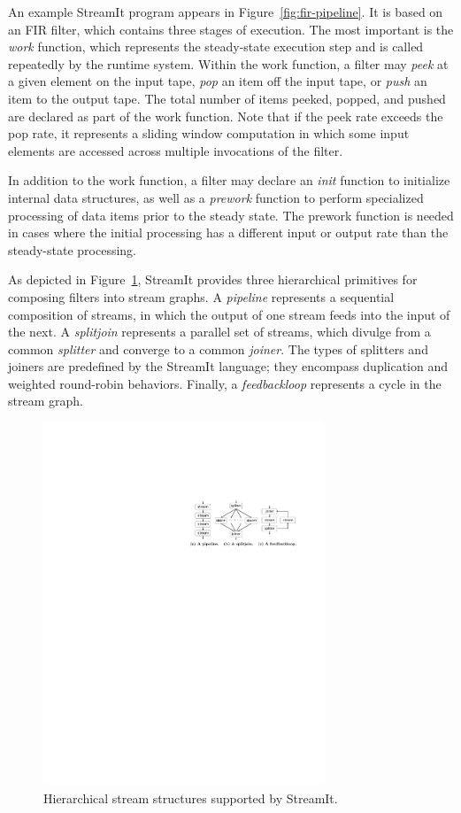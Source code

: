 An example StreamIt program appears in Figure~\ref{fig:fir-pipeline}.
It is based on an FIR filter, which contains three stages of
execution.  The most important is the {\it work} function, which
represents the steady-state execution step and is called repeatedly by
the runtime system.  Within the work function, a filter may {\it peek}
at a given element on the input tape, {\it pop} an item off the input
tape, or {\it push} an item to the output tape.  The total number of
items peeked, popped, and pushed are declared as part of the work
function.  Note that if the peek rate exceeds the pop rate, it
represents a sliding window computation in which some input elements
are accessed across multiple invocations of the filter.

In addition to the work function, a filter may declare an {\it init}
function to initialize internal data structures, as well as a {\it
  prework} function to perform specialized processing of data items
prior to the steady state.  The prework function is needed in cases
where the initial processing has a different input or output rate than
the steady-state processing.

As depicted in Figure~\ref{fig:structures}, StreamIt provides three
hierarchical primitives for composing filters into stream graphs.  A
{\it pipeline} represents a sequential composition of streams, in
which the output of one stream feeds into the input of the next.  A
{\it splitjoin} represents a parallel set of streams, which divulge
from a common {\it splitter} and converge to a common {\it joiner}.
The types of splitters and joiners are predefined by the StreamIt
language; they encompass duplication and weighted round-robin
behaviors.  Finally, a {\it feedbackloop} represents a cycle in the
stream graph.

\begin{figure}[t!]
\centering
\includegraphics[width=3.3in]{stream-structures.pdf}
\caption{Hierarchical stream structures supported by StreamIt.\protect\label{fig:structures}}
\end{figure}

